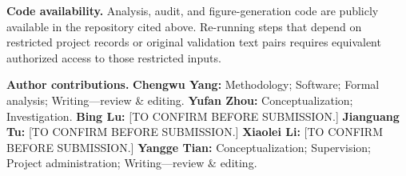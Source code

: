 \documentclass[pdflatex,sn-apa]{sn-jnl}
\begin{document}
\textbf{Code availability.} Analysis, audit, and figure-generation code are publicly available in the repository cited above. Re-running steps that depend on restricted project records or original validation text pairs requires equivalent authorized access to those restricted inputs.


\textbf{Author contributions.} \textbf{Chengwu Yang:} Methodology; Software; Formal analysis; Writing---review \& editing. \textbf{Yufan Zhou:} Conceptualization; Investigation. \textbf{Bing Lu:} [TO CONFIRM BEFORE SUBMISSION.] \textbf{Jianguang Tu:} [TO CONFIRM BEFORE SUBMISSION.] \textbf{Xiaolei Li:} [TO CONFIRM BEFORE SUBMISSION.] \textbf{Yangge Tian:} Conceptualization; Supervision; Project administration; Writing---review \& editing.


\end{document}
